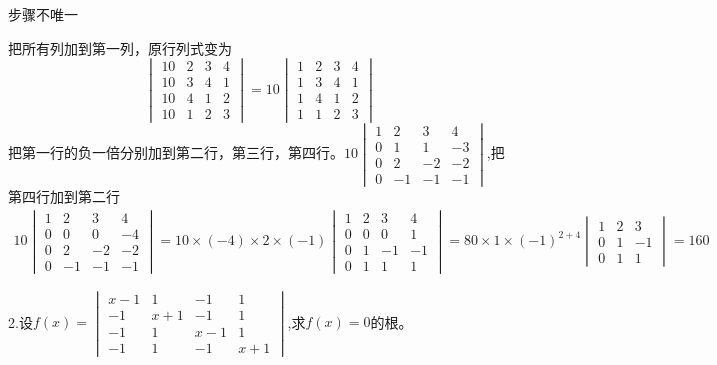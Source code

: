 \documentclass{article}
\begin{document}
\begin{jie}
步骤不唯一

把所有列加到第一列，原行列式变为
\begin{equation*}
\begin{vmatrix}
  10 & 2 & 3 & 4 \\
  10 & 3 & 4& 1 \\
  10 & 4 & 1& 2\\
   10 & 1 &2 &3
\end{vmatrix}=10\begin{vmatrix}
  1 & 2 & 3 & 4 \\
  1 & 3 & 4& 1 \\
  1 & 4 & 1& 2\\
   1 & 1 &2 &3
\end{vmatrix}
\end{equation*}
把第一行的负一倍分别加到第二行，第三行，第四行。$10
\begin{vmatrix}
  1 & 2 & 3 & 4 \\
  0 & 1 & 1& -3 \\
  0 & 2 & -2& -2\\
   0 & -1 &-1 &-1
\end{vmatrix}
$,把第四行加到第二行\begin{align*}
10
\begin{vmatrix}
  1 & 2 & 3 & 4 \\
  0 & 0 & 0& -4 \\
  0 & 2 & -2& -2\\
   0 & -1 &-1 &-1
\end{vmatrix}=10\times(-4)\times2\times(-1)\begin{vmatrix}
  1 & 2 & 3 & 4 \\
  0 & 0 & 0& 1 \\
  0 & 1 & -1& -1\\
   0 & 1 &1 &1
\end{vmatrix}=80\times1\times(-1)^{2+4}\begin{vmatrix}
  1 & 2 & 3  \\
  0 & 1 & -1\\
   0 & 1 &1
\end{vmatrix}=160
\end{align*}
\end{jie}

2.设$f(x)=
\begin{vmatrix}
  x-1 & 1 & -1 & 1 \\
  -1 & x+1 & -1& 1 \\
  -1 & 1 & x-1& 1\\
   -1 & 1 &-1 &x+1
\end{vmatrix}
$,求$f(x)=0$的根。
\end{document}
